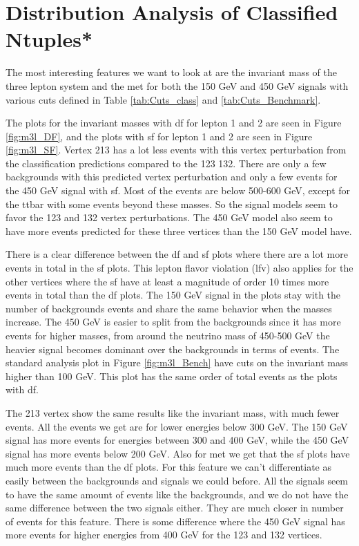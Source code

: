 \documentclass[a4paper, american, 12pt]{report}
\begin{document}
	
	
	\chapter{Distribution Analysis of Classified Ntuples*}
	\label{chap:Result-VarDist}
	The most interesting features we want to look at are the invariant mass of the three lepton system and the \acrshort{met} for both the 150 GeV and 450 GeV signals with various cuts defined in Table \ref{tab:Cuts_class} and \ref{tab:Cuts_Benchmark}. 
	
	The plots for the invariant masses with \acrshort{df} for lepton 1 and 2 are seen in Figure \ref{fig:m3l_DF}, and the plots with \acrshort{sf} for lepton 1 and 2 are seen in Figure \ref{fig:m3l_SF}. Vertex 213 has a lot less events with this vertex perturbation from the classification predictions compared to the 123 132. There are only a few backgrounds with this predicted vertex perturbation and only a few events for the 450 GeV signal with \acrshort{sf}. Most of the events are below 500-600 GeV, except for the ttbar with some events beyond these masses. So the signal models seem to favor the 123 and 132 vertex perturbations. The 450 GeV model also seem to have more events predicted for these three vertices than the 150 GeV model have. 
	
	There is a clear difference between the \acrshort{df} and \acrshort{sf} plots where there are a lot more events in total in the \acrshort{sf} plots. This lepton flavor violation (\acrshort{lfv}) also applies for the other vertices where the \acrshort{sf} have at least a magnitude of order 10 times more events in total than the \acrshort{df} plots. The 150 GeV signal in the plots stay with the number of backgrounds events and share the same behavior when the masses increase. The 450 GeV is easier to split from the backgrounds since it has more events for higher masses, from around the neutrino mass of 450-500 GeV the heavier signal becomes dominant over the backgrounds in terms of events. The standard analysis plot in Figure \ref{fig:m3l_Bench} have cuts on the invariant mass higher than 100 GeV. This plot has the same order of total events as the plots with \acrshort{df}.

	The 213 vertex show the same results like the invariant mass, with much fewer events. All the events we get are for lower energies below 300 GeV. The 150 GeV signal has more events for energies between 300 and 400 GeV, while the 450 GeV signal has more events below 200 GeV. Also for \acrshort{met} we get that the \acrshort{sf} plots have much more events than the \acrshort{df} plots. For this feature we can't differentiate as easily between the backgrounds and signals we could before. All the signals seem to have the same amount of events like the backgrounds, and we do not have the same difference between the two signals either. They are much closer in number of events for this feature. There is some difference where the 450 GeV signal has more events for higher energies from 400 GeV for the 123 and 132 vertices.
	
\end{document}
